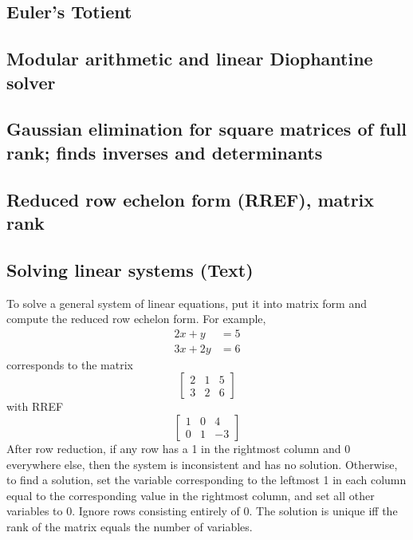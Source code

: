 \documentclass[10pt]{extarticle}
\begin{document}
\begin{multicols*}{3}
\subsection{Euler's Totient} %


\subsection{Modular arithmetic and linear Diophantine solver} %


\subsection{Gaussian elimination for square matrices of full rank; finds
inverses and determinants} %


\subsection{Reduced row echelon form (RREF), matrix rank} %


\subsection{Solving linear systems (Text)} %
To solve a general system of linear equations, put it into matrix form and
compute the reduced row echelon form. For example,
\begin{align*}2x + y &= 5 \\ 3x + 2y &= 6\end{align*}
corresponds to the matrix
\[ \left[ \begin{array}{cc|c} 2 & 1 & 5 \\ 3 & 2 & 6 \end{array} \right] \]
with RREF
\[ \left[ \begin{array}{cc|c} 1 & 0 & 4 \\ 0 & 1 & -3 \end{array} \right] \]
After row reduction, if any row has a 1 in the rightmost column and 0
everywhere else, then the system is inconsistent and has no solution.
Otherwise, to find a solution, set the variable corresponding to the leftmost 1
in each column equal to the corresponding value in the rightmost column, and
set all other variables to 0. Ignore rows consisting entirely of 0. The
solution is unique iff the rank of the matrix equals the number of variables.


\end{multicols*}
\end{document}
